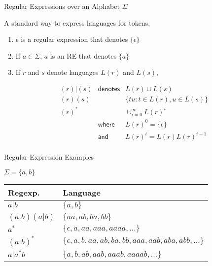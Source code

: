 \documentclass{plt}
\begin{document}
\begin{frame}{Regular Expressions over an Alphabet $\Sigma$}

A standard way to express languages for tokens.

\begin{enumerate}

\item $\epsilon$ is a regular expression that denotes $\{\epsilon\}$

\item If $a \in \Sigma$, $a$ is an RE that denotes $\{a\}$

\item If $r$ and $s$ denote languages $L(r)$ and $L(s)$,

\[
\begin{array}{lll}
(r)|(s) &\textsf{denotes}& L(r) \cup L(s) \\[10pt]
(r)(s) && \{ tu : t \in L(r), u \in L(s) \} \\[10pt]
(r)^* && \cup_{i=0}^{\infty} L(r)^i \\
& \textsf{where} & L(r)^0 = \{\epsilon\}\ \\
& \textsf{and} & L(r)^i = L(r) L(r)^{i-1} \\
\end{array}
\]

\end{enumerate}

\end{frame}

\begin{frame}{Regular Expression Examples}

$\Sigma = \{ a, b \}$

\begin{tabular}{ll}
\toprule
\textbf{Regexp.} & \textbf{Language} \\
\midrule
$a | b$ & $\{ a, b \}$ \\
$(a|b)(a|b)$ & $\{ aa, ab, ba, bb \}$ \\
$a^*$ & $\{ \epsilon, a, aa, aaa, aaaa, \ldots \}$ \\
$(a|b)^*$ & $\{ \epsilon, a, b, aa, ab, ba, bb, aaa, aab, aba, abb,
\ldots \}$ \\
$a | a^*b$ & $\{ a, b, ab, aab, aaab, aaaab, \ldots \}$ \\
\bottomrule
\end{tabular}

\end{frame}
\end{document}
